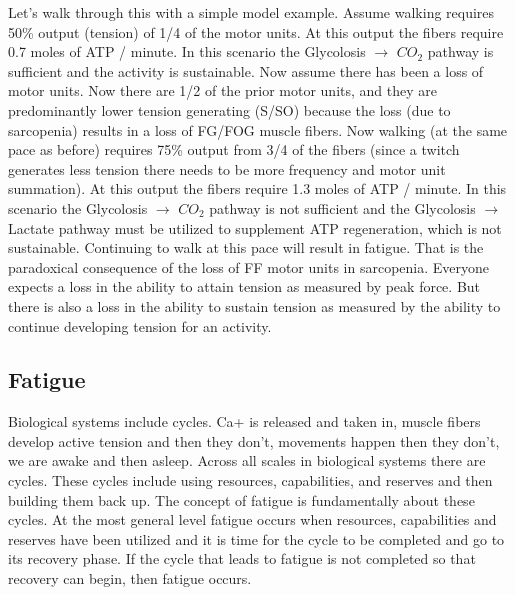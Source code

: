 Let's walk through this with a simple model example. Assume walking requires 50\% output (tension) of 1/4 of the motor units. At this output the fibers require 0.7 moles of ATP / minute. In this scenario the Glycolosis $\rightarrow$ $CO_2$ pathway is sufficient and the activity is sustainable. Now assume there has been a loss of motor units. Now there are 1/2 of the prior motor units, and they are predominantly lower tension generating (S/SO) because the loss (due to sarcopenia) results in a loss of FG/FOG muscle fibers. Now walking (at the same pace as before) requires 75\% output from 3/4 of the fibers (since a twitch generates less tension there needs to be more frequency and motor unit summation). At this output the fibers require 1.3 moles of ATP / minute. In this scenario the Glycolosis $\rightarrow$ $CO_2$ pathway is not sufficient and the Glycolosis $\rightarrow$ Lactate pathway must be utilized to supplement ATP regeneration, which is not sustainable. Continuing to walk at this pace will result in fatigue. That is the paradoxical consequence of the loss of FF motor units in sarcopenia. Everyone expects a loss in the ability to attain tension as measured by peak force. But there is also a loss in the ability to sustain tension as measured by the ability to continue developing tension for an activity.


\subsection{Fatigue}


Biological systems include cycles. Ca+ is released and taken in, muscle fibers develop active tension and then they don't, movements happen then they don't, we are awake and then asleep. Across all scales in biological systems there are cycles. These cycles include using resources, capabilities, and reserves and then building them back up. The concept of fatigue is fundamentally about these cycles. At the most general level fatigue occurs when resources, capabilities and reserves have been utilized and it is time for the cycle to be completed and go to its recovery phase. If the cycle that leads to fatigue is not completed so that recovery can begin, then fatigue occurs.

